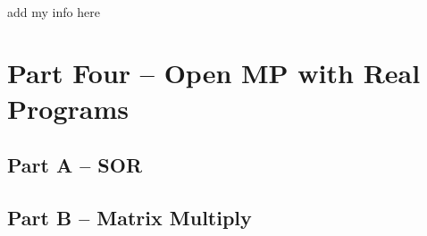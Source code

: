\documentclass[10pt,8.5in,11in]{article}
\begin{document}
	\paragraph{}
	add my info here
	
\pagebreak		
\section{Part Four -- Open MP with Real Programs}	

	\subsection{Part A -- SOR}
	
	\subsection{Part B -- Matrix Multiply}
	
\end{document}
